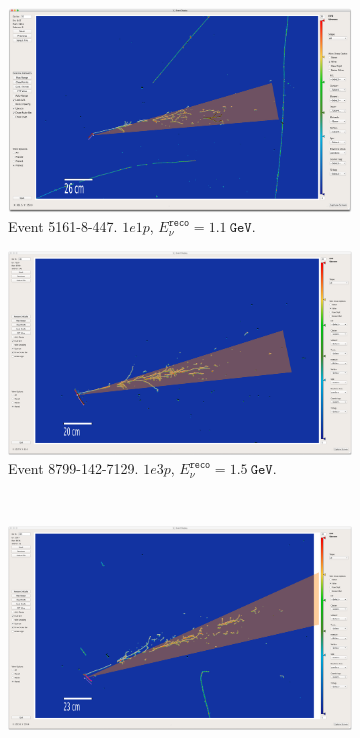 \begin{figure}[H]
    \begin{center}
    \begin{subfigure}{0.45\textwidth}
    \includegraphics[width=1.00\textwidth]{Sidebands/Figures/1eNp/HighEnergy/EVD/evt-5161-8-447_reco2.png}
    \caption{Event 5161-8-447. $1e1p$, $E_\nu^{\texttt{reco}} = 1.1~\texttt{GeV}$.}
    \end{subfigure}
    \begin{subfigure}{0.45\textwidth}
    \includegraphics[width=1.00\textwidth]{Sidebands/Figures/1eNp/HighEnergy/EVD/evt-8799-142-7129_reco2.png}
    \caption{Event 8799-142-7129. $1e3p$, $E_\nu^{\texttt{reco}} = 1.5~\texttt{GeV}$.}
    \end{subfigure} \\
    \vspace{0.3cm}
    \begin{subfigure}{0.45\textwidth}
    \includegraphics[width=1.00\textwidth]{Sidebands/Figures/1eNp/HighEnergy/EVD/evt-8936-51-2567_reco2.png}

\end{subfigure}
\end{center}
\end{figure}
